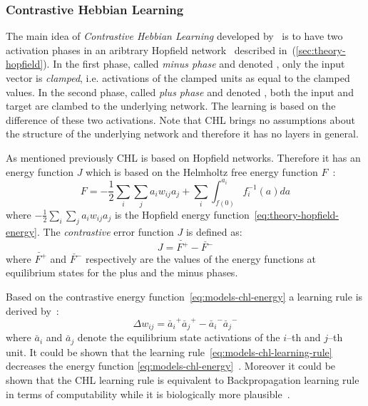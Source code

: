 
\subsubsection{Contrastive Hebbian Learning}
\label{sec:models-chl} 

The main idea of \emph{Contrastive Hebbian Learning} developed by~\citet{movellan1990contrastive} is to have two activation phases in an aribtrary Hopfield network~\citep{hopfield1984neurons} described in~(\ref{sec:theory-hopfield}). In the first phase, called \emph{minus phase} and denoted \quotes{-}, only the input vector is \emph{clamped}, i.e. activations of the clamped units as equal to the clamped values. In the second phase, called \emph{plus phase} and denoted \quotes{+}, both the input and target are clambed to the underlying network. The learning is based on the difference of these two activations. Note that CHL brings no assumptions about the structure of the underlying network and therefore it has no layers in general. 

As mentioned previously CHL is based on Hopfield networks. Therefore it has an energy function $J$ which is based on the Helmholtz free energy function $F$~\citep{hinton1989deterministic}:
\begin{equation}
  \label{eq:models-chl-helmholtz}
  F = -\frac{1}{2}\sum_i\sum_ja_iw_{ij}a_j + \sum_i \int_{f(0)}^{a_i} f_i^{-1}(a)da
\end{equation} 
where $-\frac{1}{2}\sum_i\sum_ja_iw_{ij}a_j$ is the Hopfield energy function~\ref{eq:theory-hopfield-energy}. The \emph{contrastive} error function $J$ is defined as: 
\begin{equation}
  \label{eq:models-chl-energy}
  J = \breve{F^{+}} - \breve{F^{-}}
\end{equation} 
where $\breve{F^{+}}$ and $\breve{F^{-}}$ respectively are the values of the energy functions at equilibrium states for the plus and the minus phases. 

Based on the contrastive energy function~\ref{eq:models-chl-energy} a learning rule is derived by~\citet{movellan1990contrastive}: 
\begin{equation}
  \label{eq:models-chl-learning-rule}
  \Delta w_{ij} = \breve{a_i}^{+}\breve{a_j}^{+} - \breve{a_i}^{-}\breve{a_j}^{-}
\end{equation}
where $\breve{a_i}$ and $\breve{a_j}$ denote the equilibrium state activations of the $i$--th and $j$--th unit. It could be shown that the learning rule~\ref{eq:models-chl-learning-rule} decreases the energy function \ref{eq:models-chl-energy}~\citep{movellan1990contrastive}. Moreover it could be shown that the CHL learning rule is equivalent to Backpropagation learning rule in terms of computability while it is biologically more plausible~\citep{o1996bio, xie2003equivalence}. 

   
